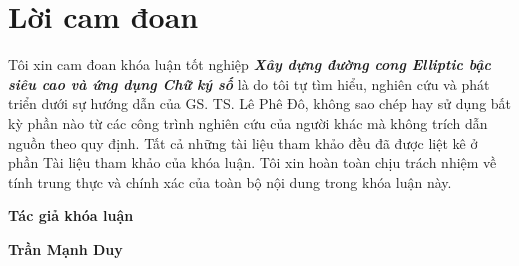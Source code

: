 \clearpage
{}

\chapter*{Lời cam đoan}

Tôi xin cam đoan khóa luận tốt nghiệp \textit{\textbf{Xây dựng đường cong Elliptic bậc siêu cao và ứng dụng Chữ ký số}} là do tôi tự tìm hiểu, nghiên cứu và phát triển dưới sự hướng dẫn của GS. TS. Lê Phê Đô, không sao chép hay sử dụng bất kỳ phần nào từ các công trình nghiên cứu của người khác mà không trích dẫn nguồn theo quy định. Tất cả những tài liệu tham khảo đều đã được liệt kê ở phần Tài liệu tham khảo của khóa luận. Tôi xin hoàn toàn chịu trách nhiệm về tính trung thực và chính xác của toàn bộ nội dung trong khóa luận này.

\vspace{1cm}

\hspace{9.4cm}\textbf{Tác giả khóa luận}
\vspace{2.5cm}

\hspace{9.3cm}\textbf{Trần Mạnh Duy}

